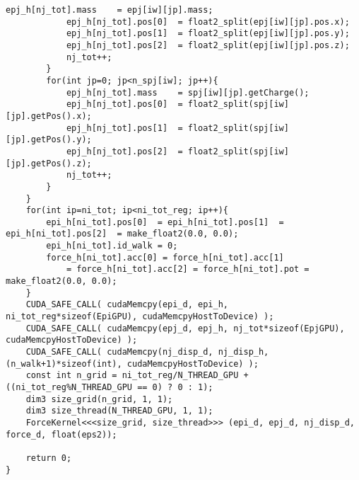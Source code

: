 \begin{lstlisting}[caption=calcForceDispatch]
            epj_h[nj_tot].mass    = epj[iw][jp].mass;
            epj_h[nj_tot].pos[0]  = float2_split(epj[iw][jp].pos.x);
            epj_h[nj_tot].pos[1]  = float2_split(epj[iw][jp].pos.y);
            epj_h[nj_tot].pos[2]  = float2_split(epj[iw][jp].pos.z);
            nj_tot++;
        }
        for(int jp=0; jp<n_spj[iw]; jp++){
            epj_h[nj_tot].mass    = spj[iw][jp].getCharge();
            epj_h[nj_tot].pos[0]  = float2_split(spj[iw][jp].getPos().x);
            epj_h[nj_tot].pos[1]  = float2_split(spj[iw][jp].getPos().y);
            epj_h[nj_tot].pos[2]  = float2_split(spj[iw][jp].getPos().z);
            nj_tot++;
        }
    }
    for(int ip=ni_tot; ip<ni_tot_reg; ip++){
        epi_h[ni_tot].pos[0]  = epi_h[ni_tot].pos[1]  = epi_h[ni_tot].pos[2]  = make_float2(0.0, 0.0);
        epi_h[ni_tot].id_walk = 0;
        force_h[ni_tot].acc[0] = force_h[ni_tot].acc[1] 
            = force_h[ni_tot].acc[2] = force_h[ni_tot].pot = make_float2(0.0, 0.0);
    }
    CUDA_SAFE_CALL( cudaMemcpy(epi_d, epi_h, ni_tot_reg*sizeof(EpiGPU), cudaMemcpyHostToDevice) );
    CUDA_SAFE_CALL( cudaMemcpy(epj_d, epj_h, nj_tot*sizeof(EpjGPU), cudaMemcpyHostToDevice) );
    CUDA_SAFE_CALL( cudaMemcpy(nj_disp_d, nj_disp_h, (n_walk+1)*sizeof(int), cudaMemcpyHostToDevice) );
    const int n_grid = ni_tot_reg/N_THREAD_GPU + ((ni_tot_reg%N_THREAD_GPU == 0) ? 0 : 1);
    dim3 size_grid(n_grid, 1, 1);
    dim3 size_thread(N_THREAD_GPU, 1, 1);
    ForceKernel<<<size_grid, size_thread>>> (epi_d, epj_d, nj_disp_d, force_d, float(eps2));

    return 0;
}
\end{lstlisting}

